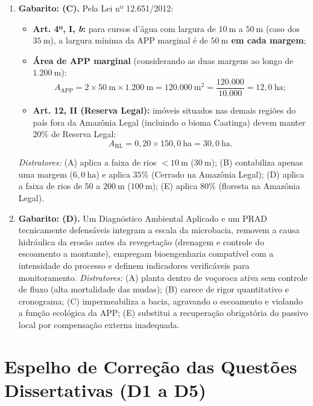 \begin{boxGabarito}
\begin{enumerate}[leftmargin=1.8em, itemsep=5pt]
  \item \textbf{Gabarito: (C).} Pela Lei nº 12.651/2012:
  \begin{itemize}[leftmargin=1.4em, itemsep=1pt, topsep=2pt]
    \item \textbf{Art. 4º, I, \textit{b}:} para cursos d'água com largura de $10\ \text{m}$ a $50\ \text{m}$ (caso dos $35\ \text{m}$), a largura mínima da APP marginal é de \textbf{$50\ \text{m}$ em cada margem};
    \item \textbf{Área de APP marginal} (considerando as duas margens ao longo de $1.200\ \text{m}$):
    \[
      A_{\text{APP}} = 2 \times 50\ \text{m} \times 1.200\ \text{m} = 120.000\ \text{m}^2 = \frac{120.000}{10.000} = 12,0\ \text{ha};
    \]
    \item \textbf{Art. 12, II (Reserva Legal):} imóveis situados nas demais regiões do país fora da Amazônia Legal (incluindo o bioma Caatinga) devem manter \textbf{$20\%$} de Reserva Legal:
    \[
      A_{\text{RL}} = 0,20 \times 150,0\ \text{ha} = 30,0\ \text{ha}.
    \]
  \end{itemize}
  \textit{Distratores:} (A) aplica a faixa de rios $<10\ \text{m}$ ($30\ \text{m}$); (B) contabiliza apenas uma margem ($6,0\ \text{ha}$) e aplica $35\%$ (Cerrado na Amazônia Legal); (D) aplica a faixa de rios de $50$ a $200\ \text{m}$ ($100\ \text{m}$); (E) aplica $80\%$ (floresta na Amazônia Legal).

  \item \textbf{Gabarito: (D).} Um Diagnóstico Ambiental Aplicado e um PRAD tecnicamente defensáveis integram a escala da microbacia, removem a causa hidráulica da erosão antes da revegetação (drenagem e controle do escoamento a montante), empregam bioengenharia compatível com a intensidade do processo e definem indicadores verificáveis para monitoramento. \textit{Distratores:} (A) planta dentro de voçoroca ativa sem controle de fluxo (alta mortalidade das mudas); (B) carece de rigor quantitativo e cronograma; (C) impermeabiliza a bacia, agravando o escoamento e violando a função ecológica da APP; (E) substitui a recuperação obrigatória do passivo local por compensação externa inadequada.
\end{enumerate}
\end{boxGabarito}

\section*{Espelho de Correção das Questões Dissertativas (D1 a D5)}

